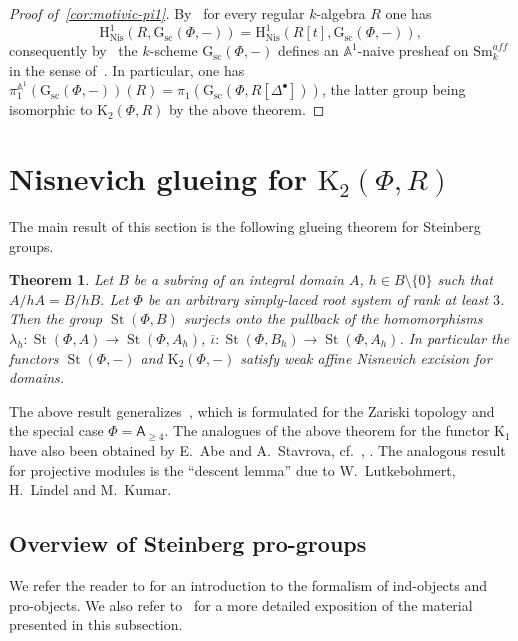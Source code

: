 \documentclass[oneside, 11pt]{amsart} \pdfoutput=1
\newcommand{\K}{{\mathrm{K}}}
\newcommand{\St}{\mathop{\mathrm{St}}\nolimits}
\newcommand{\Gsc}{\mathrm{G}_\mathrm{sc}}
\numberwithin{equation}{section}
\newtheorem{theorem}[lemma]{Theorem}
\theoremstyle{definition}
\newcommand{\rA}{\mathsf{A}}
\begin{document}
\begin{proof}[Proof of~\cref{cor:motivic-pi1}] 
 By~\cite[Corollary~5.3]{Sta20} for every regular $k$-algebra $R$ one has \[\mathrm H^1_\mathrm{Nis}(R, \Gsc(\Phi, -)) = \mathrm H^1_\mathrm{Nis}(R[t], \Gsc(\Phi, -)),\] consequently by~\cite[Theorem~2.4.2]{AHW18} the $k$-scheme $\Gsc(\Phi, -)$ defines an $\mathbb{A}^1$-naive presheaf on $\mathrm{Sm}_k^{aff}$ in the sense of~\cite[Definition~2.1.1]{AHW18}.
 In particular, one has $\pi_1^{\mathbb{A}^1}(\Gsc(\Phi, -))(R) = \pi_1(\Gsc(\Phi, R[\Delta^\bullet]))$, the latter group being isomorphic to $\K_2(\Phi, R)$ by the above theorem.
\end{proof}

\section{Nisnevich glueing for \texorpdfstring{$\K_2(\Phi, R)$}{K2(Ф,R)}} \label{sec:patching}
The main result of this section is the following glueing theorem for Steinberg groups.
\begin{theorem}\label{glueing}
Let $B$ be a subring of an integral domain $A$, $h\in B \setminus \{0\}$ such that $A / hA = B / hB$. Let $\Phi$ be an arbitrary simply-laced root system of rank at least $3$.
Then the group $\St(\Phi, B)$ surjects onto the pullback of the homomorphisms 
$\lambda_h\colon \St(\Phi, A) \to \St(\Phi, A_h)$, $\overline{\iota}\colon\St(\Phi, B_h) \to \St(\Phi, A_h)$. In particular the functors $\St(\Phi, -)$ and $\K_2(\Phi, -)$  satisfy weak affine Nisnevich excision for domains. \end{theorem}
The above result generalizes~\cite[Proposition~1.4]{Tu83}, which is formulated for the Zariski topology and the special case $\Phi=\rA_{\geq 4}$.
The analogues of the above theorem for the functor $\K_1$ have also been obtained by E.~Abe and A.~Stavrova, cf.~\cite[Lemma~3.7]{Abe83}, \cite[Lemma~3.4]{Sta14}.
The analogous result for projective modules is the ``descent lemma'' \cite[Lemma~4.7]{Bh99} due to W.~Lutkebohmert, H.~Lindel and M.~Kumar. 

\subsection{Overview of Steinberg pro-groups}
We refer the reader to \cite[Section~6.1]{SK06} for an introduction to the formalism of ind-objects and pro-objects. We also refer to~\cite[\S~2]{LSV20} for a more detailed exposition of the material presented in this subsection.
\end{document}
